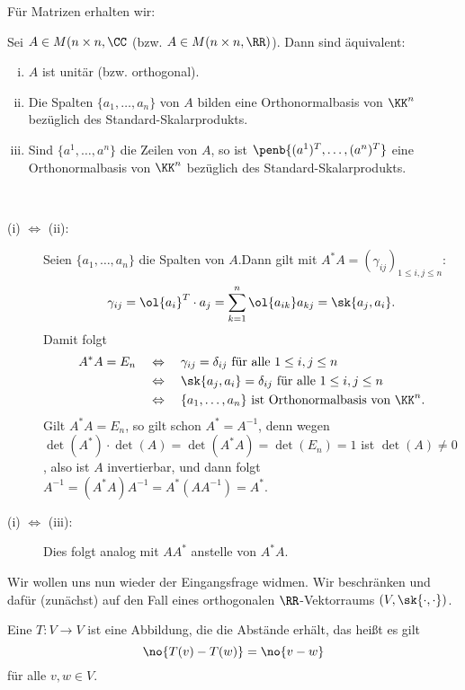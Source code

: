 Für Matrizen erhalten wir:

\begin{satz}
	\label{satz:6.9}
	Sei $A \in M(n \times n,\CC$ (bzw. $A \in M(n \times n, \RR)$).
	Dann sind äquivalent:
	\begin{enumerate}[(i)]
		\item $A$ ist unitär (bzw. orthogonal).
		\item Die Spalten $\{a_1,\dots,a_n\}$ von $A$ bilden eine Orthonormalbasis von $\KK^n$ bezüglich des Standard-Skalarprodukts.
		\item Sind $\{a^1,\dots,a^n\}$ die Zeilen von $A$, so ist $\penb{(a^1)^T,\dots,(a^n)^T}$ eine Orthonormalbasis von $\KK^n$ bezüglich des Standard-Skalarprodukts.
	\end{enumerate}
\end{satz}

\begin{beweis} \mbox{} \\[-.9cm]
	\begin{description}
		\item[(i) $\Leftrightarrow$ (ii):] Seien $\{a_1,\dots,a_n\}$ die Spalten von $A$.Dann gilt mit $A^*A = (\gamma_{ij})_{1 \leq i,j \leq n}$:
		\[
			\gamma_{ij} = \ol{a_i}^T \cdot a_j = \sum_{k=1}^{n} \ol{a_{ik}} a_{kj} = \sk{a_j,a_i}.
		\]
		Damit folgt
		\begin{align*}
			A^*A = E_n \quad &\Leftrightarrow \quad \gamma_{ij} = \delta_{ij} \text{ für alle } 1 \leq i,j \leq n \\
			&\Leftrightarrow \quad \sk{a_j,a_i} = \delta_{ij} \text{ für alle } 1 \leq i,j \leq n \\
			&\Leftrightarrow \quad \{a_1,\dots,a_n\} \text{ ist Orthonormalbasis von } \KK^n.
		\end{align*}
		\newpage
		Gilt $A^*A = E_n$, so gilt schon $A^* = A^{-1}$, denn wegen $\det(A^*) \cdot \det(A) = \det(A^*A) = \det(E_n) = 1$ ist $\det(A) \neq 0$, also ist $A$ invertierbar, und dann folgt $A^{-1} = (A^*A)A^{-1} = A^*(AA^{-1}) = A^*$.
		\item[(i) $\Leftrightarrow$ (iii):] Dies folgt analog mit $AA^*$ anstelle von $A^*A$. 
	\end{description}
\end{beweis}

Wir wollen uns nun wieder der Eingangsfrage widmen.
Wir beschränken und dafür (zunächst) auf den Fall eines orthogonalen $\RR$-Vektorraums $(V,\sk{\cdot,\cdot})$.

\begin{definition}
	\label{def:6.10}
	Eine  $T \colon V \rightarrow V$ ist eine Abbildung, die die Abstände erhält, das heißt es gilt
	\[
		\no{T(v) - T(w)} = \no{v-w}
	\]
	für alle $v,w \in V$.
\end{definition}

